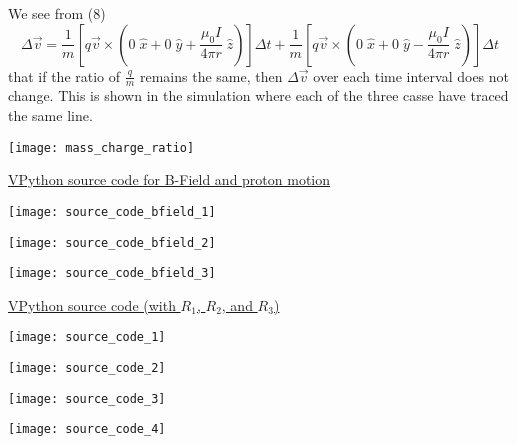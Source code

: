 \documentclass[11pt]{article}
\begin{document}
\noindent We see from (8)
\[
\Delta\vec{v}=\frac{1}{m}\left[q\vec{v}\times\left(0\;\hat{x}+0\;\hat{y}+\frac{\mu_0I}{4\pi r}\;\hat{z}\right)\right]\Delta t + \frac{1}{m}\left[q\vec{v}\times\left(0\;\hat{x}+0\;\hat{y}-\frac{\mu_0I}{4\pi r}\;\hat{z}\right)\right]\Delta t
\]
\noindent that if the ratio of $\frac{q}{m}$ remains the same, then $\Delta\vec{v}$ over each time interval does not change. This is shown in the simulation where each of the three casse have traced the same line.
\vspace{.5in}

\begin{center}
\texttt{[image: mass\_charge\_ratio]}
\end{center}

\newpage

\begin{center}
\underline{VPython source code for B-Field and proton motion}
\end{center}
\vspace{.3in}

\begin{center}
\texttt{[image: source\_code\_bfield\_1]}

\texttt{[image: source\_code\_bfield\_2]}

\texttt{[image: source\_code\_bfield\_3]}
\end{center}

\newpage

\begin{center}
\underline{VPython source code (with $R_1$, $R_2$, and $R_3$)}
\end{center}
\vspace{.3in}

\begin{center}
\texttt{[image: source\_code\_1]}
\end{center}
\begin{center}
\texttt{[image: source\_code\_2]}
\end{center}
\begin{center}
\texttt{[image: source\_code\_3]}
\end{center}
\begin{center}
\texttt{[image: source\_code\_4]}
\end{center}
\end{document}

